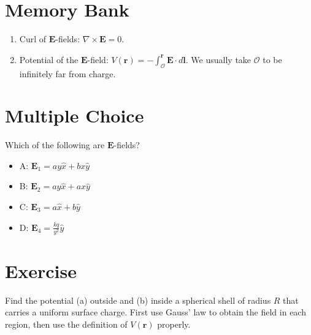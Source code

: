 \documentclass[12pt]{article}
\begin{document}
\maketitle

\section{Memory Bank}

\begin{enumerate}
\item Curl of $\mathbf{E}$-fields: $\nabla \times \mathbf{E} = 0$.
\item Potential of the $\mathbf{E}$-field: $V(\mathbf{r}) = - \int_{\mathcal{O}}^{\mathbf{r}} \mathbf{E} \cdot d\mathbf{l}$.  We usually take $\mathcal{O}$ to be infinitely far from charge.
\end{enumerate}

\section{Multiple Choice}

Which of the following are $\mathbf{E}$-fields?

\begin{itemize}
\item A: $\mathbf{E}_1 = a y \hat{x} + b x \hat{y}$
\item B: $\mathbf{E}_2 = a y \hat{x} + a x \hat{y}$
\item C: $\mathbf{E}_3 = a \hat{x} + b \hat{y}$
\item D: $\mathbf{E}_4 = \frac{k q}{y^2}\hat{y}$
\end{itemize}

\section{Exercise}

Find the potential (a) outside and (b) inside a spherical shell of radius $R$ that carries a uniform surface charge.  First use Gauss' law to obtain the field in each region, then use the definition of $V(\mathbf{r})$ properly.
\end{document}
